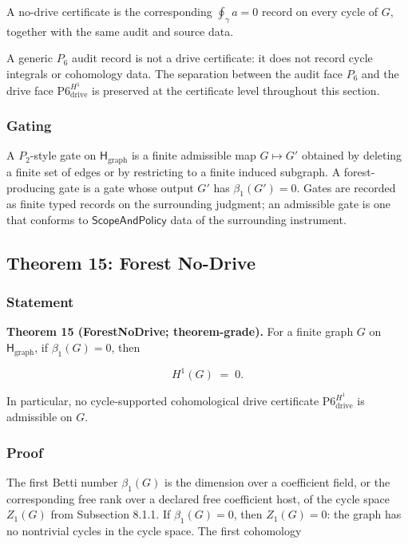 \documentclass[11pt]{article}
\theoremstyle{definition}
\begin{document}
A no-drive certificate is the corresponding \(\oint_\gamma a=0\) record on every cycle of \(G\), together with the same audit and source data.

A generic \(P_6\) audit record is not a drive certificate: it does not record cycle integrals or cohomology data. The separation between the audit face \(P_6\) and the drive face \(\mathrm{P6}_{\mathrm{drive}}^{H^1}\) is preserved at the certificate level throughout this section.

\subsubsection{Gating}

A \(P_2\)-style gate on \(\mathsf H_{\mathrm{graph}}\) is a finite admissible map \(G\mapsto G'\) obtained by deleting a finite set of edges or by restricting to a finite induced subgraph. A forest-producing gate is a gate whose output \(G'\) has \(\beta_1(G')=0\). Gates are recorded as finite typed records on the surrounding judgment; an admissible gate is one that conforms to \(\mathsf{ScopeAndPolicy}\) data of the surrounding instrument.

\subsection{Theorem 15: Forest No-Drive}

\subsubsection{Statement}

\textbf{Theorem 15 (ForestNoDrive; theorem-grade).} For a finite graph \(G\) on \(\mathsf H_{\mathrm{graph}}\), if \(\beta_1(G)=0\), then

\[
H^1(G)\;=\;0.
\]

In particular, no cycle-supported cohomological drive certificate \(\mathrm{P6}_{\mathrm{drive}}^{H^1}\) is admissible on \(G\).

\subsubsection{Proof}

The first Betti number \(\beta_1(G)\) is the dimension over a coefficient field, or the corresponding free rank over a declared free coefficient host, of the cycle space \(Z_1(G)\) from Subsection 8.1.1. If \(\beta_1(G)=0\), then \(Z_1(G)=0\): the graph has no nontrivial cycles in the cycle space. The first cohomology
\end{document}
